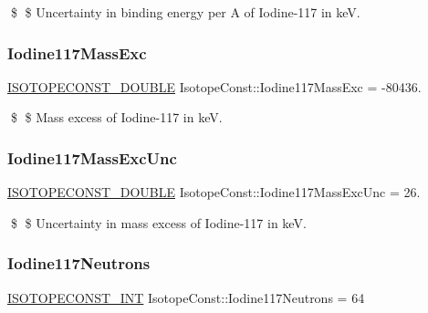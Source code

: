 \$ \$ Uncertainty in binding energy per A of Iodine-\/117 in keV. \mbox{\label{group___isotope_const-_iodine-_i117_ga062f3025084944b362e614d034b4ab85}} 
\subsubsection{\texorpdfstring{Iodine117\+Mass\+Exc}{Iodine117MassExc}}
{\footnotesize\ttfamily \mbox{\hyperlink{group___isotope_const-_macros_ga8f45a7272ce02c0b4c65c44636ed719a}{I\+S\+O\+T\+O\+P\+E\+C\+O\+N\+S\+T\+\_\+\+D\+O\+U\+B\+LE}} Isotope\+Const\+::\+Iodine117\+Mass\+Exc = -\/80436.}

\$ \$ Mass excess of Iodine-\/117 in keV. \mbox{\label{group___isotope_const-_iodine-_i117_ga503b1f8c708c6276eaa5227c369462dc}} 
\subsubsection{\texorpdfstring{Iodine117\+Mass\+Exc\+Unc}{Iodine117MassExcUnc}}
{\footnotesize\ttfamily \mbox{\hyperlink{group___isotope_const-_macros_ga8f45a7272ce02c0b4c65c44636ed719a}{I\+S\+O\+T\+O\+P\+E\+C\+O\+N\+S\+T\+\_\+\+D\+O\+U\+B\+LE}} Isotope\+Const\+::\+Iodine117\+Mass\+Exc\+Unc = 26.}

\$ \$ Uncertainty in mass excess of Iodine-\/117 in keV. \mbox{\label{group___isotope_const-_iodine-_i117_ga2a07cd5ba9e402d61fe77eff790a07dd}} 
\subsubsection{\texorpdfstring{Iodine117\+Neutrons}{Iodine117Neutrons}}
{\footnotesize\ttfamily \mbox{\hyperlink{group___isotope_const-_macros_ga5f18360b3e99483a35c32d789e62621c}{I\+S\+O\+T\+O\+P\+E\+C\+O\+N\+S\+T\+\_\+\+I\+NT}} Isotope\+Const\+::\+Iodine117\+Neutrons = 64}

